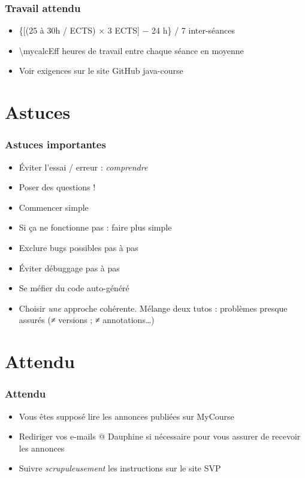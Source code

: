 \documentclass[english, french]{beamer}
\begin{document}
\begin{frame}
	\frametitle{Travail attendu}
	\begin{itemize}
		\item \{[(25 à 30h / ECTS) × 3 ECTS] − 24 h\} / 7 inter-séances
		\item \num[round-mode=places, round-precision=0, mode=text]{\mycalcEff} heures de travail entre chaque séance en moyenne
		\item Voir exigences sur le site GitHub java-course
	\end{itemize}
\end{frame}

\section{Astuces}
\begin{frame}
	\frametitle{Astuces importantes}
	\begin{itemize}
		\item Éviter l’essai / erreur : \emph{comprendre}
		\item Poser des questions !
		\item Commencer simple
		\item Si ça ne fonctionne pas : faire plus simple
		\item Exclure bugs possibles pas à pas
		\item Éviter débuggage pas à pas
		\item Se méfier du code auto-généré
		\item Choisir \emph{une} approche cohérente. Mélange deux tutos : problèmes presque assurés ({}≠ versions ; ≠ annotations…)
	\end{itemize}
\end{frame}

\section{Attendu}
\begin{frame}
	\frametitle{Attendu}
	\begin{itemize}
		\item Vous êtes supposé lire les annonces publiées sur MyCourse
		\item Rediriger vos e-mails @ Dauphine si nécessaire pour vous assurer de recevoir les annonces
		\item Suivre \emph{scrupuleusement} les instructions sur le site SVP
	\end{itemize}
\end{frame}
\end{document}
